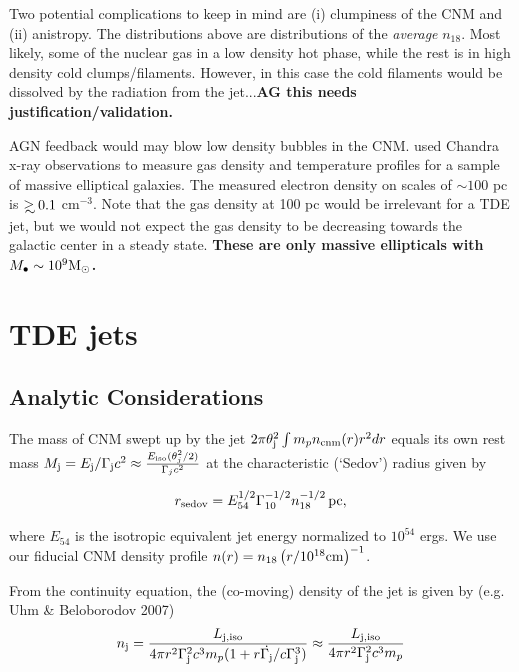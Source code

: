 \documentclass[usenatbib,fleqn]{mnras}
\newcommand\gsim{\mathrel{\rlap{\lower4pt\hbox{\hskip1pt$\sim$}}
    \raise1pt\hbox{$>$}}}
\newcommand{\Mbh}[1][]{M_{\bullet#1}}
\newcommand{\Msun}{{\rm M_\odot}}
\begin{document}
Two potential complications to keep in mind are (i) clumpiness of the
CNM and (ii) anistropy. The distributions above are
distributions of the {\it average} $n_{18}$.  Most likely, some of the
nuclear gas in a low density hot phase, while the rest is in high density
cold clumps/filaments. However, in this case the cold filaments would
be dissolved by the radiation from the jet...{\bf AG this needs
  justification/validation.}


AGN feedback would may blow low density bubbles in the
CNM. \citet{Russell+2013} used Chandra x-ray observations to measure gas
density and temperature profiles for a sample of massive elliptical
galaxies. The measured electron density on scales of $\sim 100$ pc is $\gsim 0.1$ cm$^{-3}$. Note that the gas density at 100 pc
would be irrelevant for a TDE jet, but we would not expect the gas
density to be decreasing towards the galactic center in a steady
state. {\bf These are only massive ellipticals with $\Mbh\sim 10^{9} \Msun$.}



\section{TDE jets}
\label{sec:jet}

\subsection{Analytic Considerations}
\label{sec:analytic}


The mass of CNM swept up by the jet $2\pi\theta_{\rm j}^{2}\int m_p
n_{\rm cnm}(r) r^{2}dr$ equals its own rest mass $M_{\rm j} = E_{\rm
  j}/\Gamma_{\rm j}c^{2} \approx \frac{E_{\rm iso}
  (\theta_j^2/2)}{\Gamma_j c^2} $ at the characteristic (`Sedov')
radius given by

\begin{equation}
r_{\rm sedov} = E_{54}^{1/2} \Gamma_{10}^{-1/2} n_{\rm 18}^{-1/2}\,{\rm pc}, 
\end{equation}

where $E_{54}$ is the isotropic equivalent jet energy normalized to
$10^{54}$ ergs. We use our fiducial CNM density profile $n(r)=n_{18}
\left(r/10^{18} {\rm cm}\right)^{-1}$.

From the continuity equation, the (co-moving) density of the jet is
given by (e.g. Uhm \& Beloborodov 2007)
 \begin{align}
   n_{\rm j} =  \frac{L_{\rm j, iso}}{4 \pi r^{2}\Gamma_{\rm
       j}^{2}c^{3}m_p(1 + r \dot{\Gamma_{\rm j}}/c\Gamma_{\rm j}^{3})}
   \approx  \frac{L_{\rm j, iso}}{4 \pi r^{2}\Gamma_{\rm j}^{2}c^{3}m_p}
\end{align}
\end{document}
